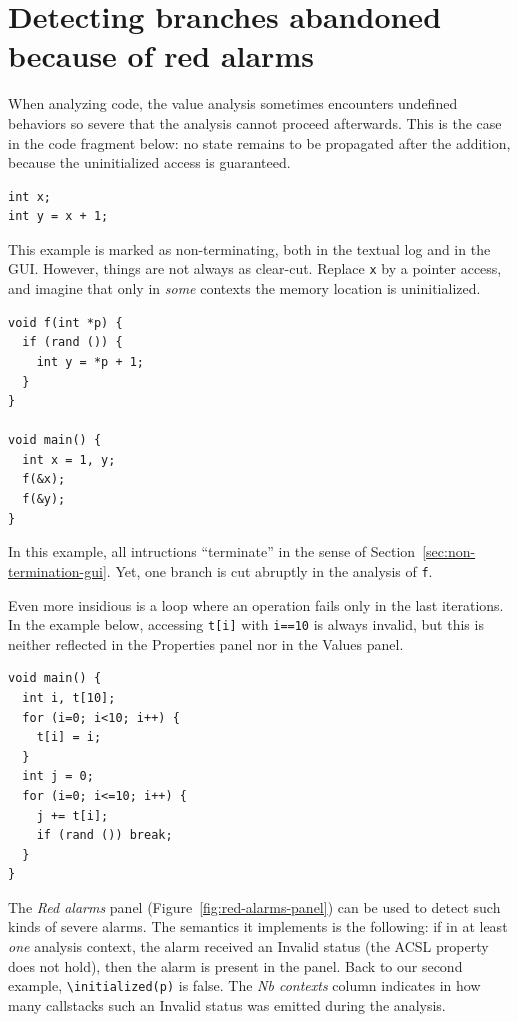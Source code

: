 \section{Detecting branches abandoned because of red alarms}
\label{red-alarms}

When analyzing code, the value analysis sometimes encounters undefined
behaviors so severe that the analysis cannot proceed afterwards.
This is the case in the code fragment below: no state remains to be
propagated after the addition, because the uninitialized access is guaranteed.

\begin{lstlisting}
int x;
int y = x + 1;
\end{lstlisting}

This example is marked as non-terminating, both in the textual log and in
the GUI.
%
However, things are not always as clear-cut. Replace \lstinline+x+ by
a pointer access, and imagine that only in \emph{some} contexts the memory
location is uninitialized.

\begin{lstlisting}
void f(int *p) {
  if (rand ()) {
    int y = *p + 1;
  }
}

void main() {
  int x = 1, y;
  f(&x);
  f(&y);
}
\end{lstlisting}
In this example, all intructions ``terminate'' in the sense of
Section~\ref{sec:non-termination-gui}. Yet, one branch is cut abruptly
in the analysis of \lstinline+f+.

Even more insidious is a loop where an operation fails only in the last
iterations. In the example below, accessing \lstinline|t[i]| with
\lstinline|i==10| is always invalid, but this is neither reflected
in the Properties panel nor in the Values panel.

\begin{lstlisting}
void main() {
  int i, t[10];
  for (i=0; i<10; i++) {
    t[i] = i;
  }
  int j = 0;
  for (i=0; i<=10; i++) {
    j += t[i];
    if (rand ()) break;
  }
}
\end{lstlisting}

The {\em Red alarms} panel (Figure~\ref{fig:red-alarms-panel}) can be used to
detect such kinds of severe alarms.
The semantics it implements is the following: if in at least \emph{one}
analysis context, the alarm received an Invalid status (the ACSL property
does not hold), then the alarm is present in the panel.
Back to our second example, \lstinline+\initialized(p)+ is false.
The \emph{Nb contexts} column indicates in how many callstacks such an Invalid
status was emitted during the analysis.

